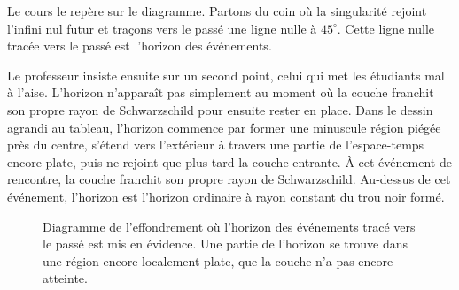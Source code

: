 Le cours le repère sur le diagramme. Partons du coin où la singularité rejoint l’infini nul futur et traçons vers le passé une ligne nulle à \(45^\circ\). Cette ligne nulle tracée vers le passé est l’horizon des événements.

Le professeur insiste ensuite sur un second point, celui qui met les étudiants mal à l’aise. L’horizon n’apparaît pas simplement au moment où la couche franchit son propre rayon de Schwarzschild pour ensuite rester en place. Dans le dessin agrandi au tableau, l’horizon commence par former une minuscule région piégée près du centre, s’étend vers l’extérieur à travers une partie de l’espace-temps encore plate, puis ne rejoint que plus tard la couche entrante. À cet événement de rencontre, la couche franchit son propre rayon de Schwarzschild. Au-dessus de cet événement, l’horizon est l’horizon ordinaire à rayon constant du trou noir formé.

\begin{figure}[htbp]
\centering
{}
\caption{Diagramme de l’effondrement où l’horizon des événements tracé vers le passé est mis en évidence. Une partie de l’horizon se trouve dans une région encore localement plate, que la couche n’a pas encore atteinte.}
\end{figure}

